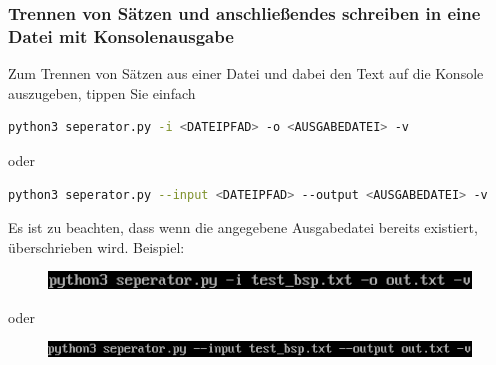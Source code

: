 \documentclass[12pt]{scrartcl}
\begin{document}
\subsubsection{Trennen von Sätzen und anschließendes schreiben in eine Datei mit Konsolenausgabe}
\label{sec:first-steps-extraction-file-with}
Zum Trennen von Sätzen aus einer Datei und dabei den Text auf die Konsole auszugeben, tippen Sie einfach
\begin{lstlisting}[language=bash]
python3 seperator.py -i <DATEIPFAD> -o <AUSGABEDATEI> -v
\end{lstlisting}
\begin{center}
oder
\end{center}
\begin{lstlisting}[language=bash] 
python3 seperator.py --input <DATEIPFAD> --output <AUSGABEDATEI> -v
\end{lstlisting}
Es ist zu beachten, dass wenn die angegebene Ausgabedatei bereits existiert, überschrieben wird. 
Beispiel:
\begin{figure}[htbp]
\includegraphics[width=1.0\textwidth]{ersteSchrittSaetzeTrennenFileWithConsole001}\par\vspace{0.25cm}
\label{fig:ersteSchrittSaetzeTrennenFileWithConsole001}
\end{figure}
\begin{center}
oder
\end{center}
\begin{figure}[htbp]
\includegraphics[width=1.0\textwidth]{ersteSchrittSaetzeTrennenFileWithConsole002}\par

\vspace{0.25cm}
\label{fig:ersteSchrittSaetzeTrennenFileWithConsole002}
\end{figure}
\begin{figure}[htbp]
\centering
\end{figure}
\newpage
\end{document}

